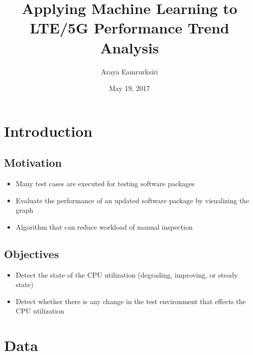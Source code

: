 \documentclass{beamer}
\title[Master Thesis]{Applying Machine Learning to LTE/5G Performance Trend Analysis} %
\author{Araya Eamrurksiri}
\institute[LiU] %
{
Linkoping university \\ %
\medskip
\textit{} %
}
\date{May 19, 2017}
\begin{document}
\begin{frame}
\titlepage %
\end{frame}



\section{Introduction} 
\subsection{Motivation}
\begin{frame}

\begin{itemize}
	\item Many test cases are executed for testing software packages 
	\item Evaluate the performance of an updated software package by visualizing the graph 
	\item Algorithm that can reduce workload of manual inspection
\end{itemize}	

\end{frame}
\subsection{Objectives}
\begin{frame}
\begin{itemize}
	\item Detect the state of the CPU utilization (degrading, improving, or steady state)
	\item Detect whether there is any change in the test environment that effects the CPU utilization
\end{itemize}
\end{frame}

\section{Data}
\end{document}
